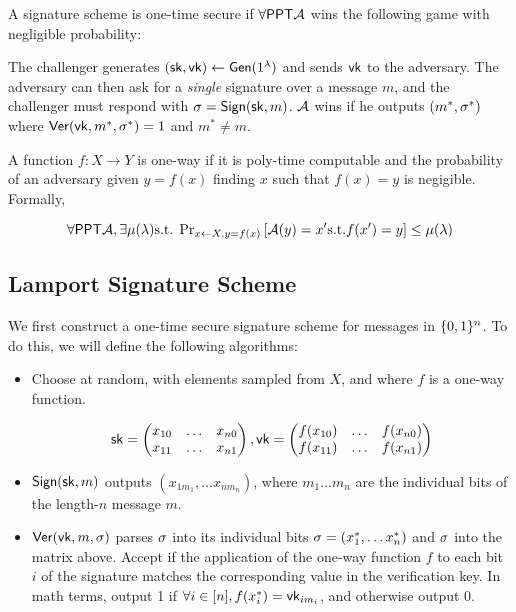 \begin{definition}
	A signature scheme is one-time secure if $\forall \mathsf{PPT} \mathcal{A}$ wins the following game with negligible probability:

	The challenger generates $({\mathsf{sk}}, \mathsf{vk}) \leftarrow \mathsf{Gen}(1^\lambda)$ and sends $\mathsf{vk}$ to the adversary. The adversary can then ask for a \emph{single} signature over a message $m$, and the challenger must respond with $\sigma = \mathsf{Sign}({\mathsf{sk}}, m)$. $\mathcal{A}$ wins if he outputs $(m^*, \sigma^*)$ where $\mathsf{Ver}(\mathsf{vk}, m^*, \sigma^*) = 1$ and $m^* \neq m$.
\end{definition}


\begin{definition}
	A function $f: X \rightarrow Y$ is one-way if it is poly-time computable and the probability of an adversary given $y=f(x)$ finding $x$ such that $f(x) = y$ is negigible. Formally,

	\[ \forall \mathsf{PPT} \mathcal{A}, \exists \mu(\lambda) \text{s.t. } \text{Pr}_{x \leftarrow X, y = f(x)}\left[\mathcal{A}(y) = x' \text{s.t.} f(x')=y\right] \leq \mu(\lambda) \]
\end{definition}

\subsection{Lamport Signature Scheme}
We first construct a one-time secure signature scheme for messages in $\{0,1\}^n$. To do this, we will define the following algorithms:


\begin{itemize}
	\item Choose at random, with elements sampled from $X$, and where $f$ is a one-way function.

\[ {\mathsf{sk}} = \begin{pmatrix}
	x_{10} & \ldots & x_{n0} \\
	x_{11} & \ldots & x_{n1} \\
	\end{pmatrix}, \mathsf{vk} = \begin{pmatrix}
	f(x_{10}) & \ldots & f(x_{n0}) \\
	f(x_{11}) & \ldots & f(x_{n1}) \\
\end{pmatrix}\]
	\item $\mathsf{Sign}({\mathsf{sk}}, m)$ outputs $(x_{1m_1}, \ldots x_{nm_n})$, where $m_1 \ldots m_n$ are the individual bits of the length-$n$ message $m$.
	\item $\mathsf{Ver}(\mathsf{vk}, m, \sigma)$ parses $\sigma$ into its individual bits $\sigma = (x_1^*, \ldots x_n^*)$ and $\sigma$ into the matrix above. Accept if the application of the one-way function $f$ to each bit $i$ of the signature matches the corresponding value in the verification key. In math terms, output 1 if $\forall i \in [n], f(x^*_i) = \mathsf{vk}_{im_i}$, and otherwise output 0.
\end{itemize}

